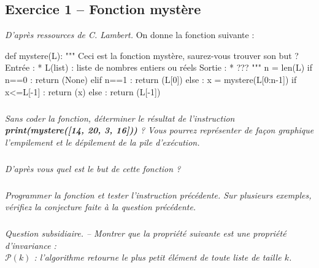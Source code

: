 \subsection*{Exercice 1 -- Fonction mystère}
\textit{D'après ressources de C. Lambert.}
On donne la fonction suivante : 
\begin{py}
\begin{python}
def mystere(L):
    """
    Ceci est la fonction mystère, saurez-vous 
    trouver son but ?
    Entrée : 
        * L(list) : liste de nombres entiers
    ou réels
    Sortie : 
        * ??? 
    """
    n = len(L)
    if n==0 :
        return (None)
    elif n==1 :
        return (L[0])
    else :
        x = mystere(L[0:n-1])
        if x<=L[-1] :
            return (x)
        else : 
            return (L[-1])
\end{python}
\end{py}

\subparagraph{}
\textit{Sans coder la fonction, déterminer le résultat de l'instruction \textbf{print(mystere([14, 20, 3, 16]))} ? Vous pourrez représenter de façon graphique l'empilement et le dépilement de la pile d'exécution.}

\subparagraph{}
\textit{D'après vous quel est le but de cette fonction ?}

\subparagraph{}
\textit{Programmer la fonction et tester l'instruction précédente. Sur plusieurs exemples, vérifiez la conjecture faite à la question précédente.}


\subparagraph{}
\textit{Question subsidiaire. -- Montrer que la propriété suivante est une propriété d'invariance :\\
$\mathcal{P}(k)$ : l'algorithme retourne le plus petit élément de toute liste de taille $k$.}

